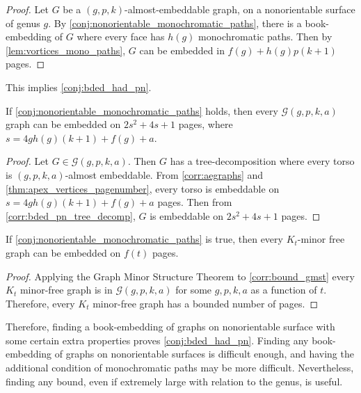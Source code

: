 \begin{proof}
	Let $G$ be a $(g, p, k)$-almost-embeddable graph, on a nonorientable surface of genus $g$. By \cref{conj:nonorientable_monochromatic_paths}, there is a book-embedding of $G$ where every face has $h(g)$ monochromatic paths. Then by \cref{lem:vortices_mono_paths}, $G$ can be embedded in $f(g) + h(g) p (k+1)$ pages. 
\end{proof}

This implies \cref{conj:bded_had_pn}.
\begin{corollary}\label{corr:bound_gmst}
	If \cref{conj:nonorientable_monochromatic_paths} holds, then every $\mathcal{G}(g, p, k, a)$ graph can be embedded on $2s^2 + 4s + 1$ pages, where $s =  4g h(g) (k + 1) + f(g) + a$. 
\end{corollary}

\begin{proof}
	Let $G \in \mathcal{G}(g, p, k, a)$. Then $G$ has a tree-decomposition where every torso is $(g, p, k, a)$-almost embeddable. From \cref{corr:aegraphs} and \cref{thm:apex_vertices_pagenumber}, every torso is embeddable on $s = 4g h(g) (k + 1) + f(g) + a$ pages. Then from \cref{corr:bded_pn_tree_decomp}, $G$ is embeddable on $2s^2 + 4s + 1$ pages.
\end{proof}

\begin{corollary}
	If \cref{conj:nonorientable_monochromatic_paths} is true, then every $K_t$-minor free graph can be embedded on $f(t)$ pages. 
\end{corollary}

\begin{proof}
	Applying the Graph Minor Structure Theorem to \cref{corr:bound_gmst} every $K_t$ minor-free graph is in $\mathcal{G}(g, p, k, a)$ for some $g, p, k, a$ as a function of $t$. Therefore, every $K_t$ minor-free graph has a bounded number of pages. 
\end{proof}

Therefore, finding a book-embedding of graphs on nonorientable surface with some certain extra properties proves \cref{conj:bded_had_pn}. Finding any book-embedding of graphs on nonorientable surfaces is difficult enough, and having the additional condition of monochromatic paths may be more difficult. Nevertheless, finding any bound, even if extremely large with relation to the genus, is useful. 